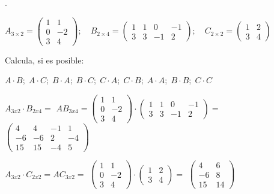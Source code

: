 \begin{ejem}.

$A_{3\times 2}=	\left( \begin{matrix}  1&1\\0&-2\\3&4 \end{matrix}\right); \quad 
B_{2\times 4}=\left( \begin{matrix}  1&1&0&-1 \\ 3&3&-1&2 \end{matrix}\right); \quad 
C_{2\times 2}=\left( \begin{matrix}  1&2\\3&4 \end{matrix}\right)$

Calcula, si es posible: 

$A\cdot B; \; A\cdot C; \; B\cdot A;\; B\cdot C;\; C\cdot A; \; C\cdot B; \; A\cdot A; \; B\cdot B; \; C\cdot C $


\noindent $A_{3x2}\cdot B_{2x4}=$
\small{$AB_{3x4}=\left( \begin{matrix}  \boxed{1}&\boxed{1}\\0&-2\\3&4 \end{matrix}\right) \cdot \left( \begin{matrix}  \boxed{1}&1&0&-1 \\ \boxed{3}&3&-1&2 \end{matrix}\right)$}\normalsize{$=$}
$\left( \begin{matrix} \boxed{4}&4&-1&1\\-6&-6&2&-4\\15&15&-4&5  \end{matrix}\right)$

\noindent $A_{3x2}\cdot C_{2x2}=AC_{3x2}=$
\small{$\left( \begin{matrix}  1&1\\\boxed{0}&\boxed{-2}\\3&4 \end{matrix}\right) 
\cdot  \left( \begin{matrix}  1&\boxed{2}\\3&\boxed{4} \end{matrix}\right)$}\normalsize{$=$}
$\left( \begin{matrix} 4&6\\-6&\boxed{8}\\15&14  \end{matrix}\right)$


\end{ejem}

